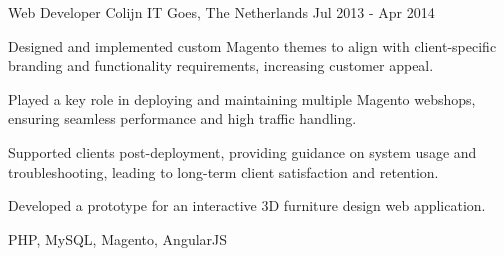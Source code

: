 \begin{cventries}
  \cventry
    {Web Developer} %
    {Colijn IT} %
    {Goes, The Netherlands} %
    {Jul 2013 - Apr 2014} %
    {
      \begin{cvitems} %
        \item {Designed and implemented custom Magento themes to align with client-specific branding and functionality requirements, increasing customer appeal.}
        \item {Played a key role in deploying and maintaining multiple Magento webshops, ensuring seamless performance and high traffic handling.  }
        \item {Supported clients post-deployment, providing guidance on system usage and troubleshooting, leading to long-term client satisfaction and retention.}
        \item {Developed a prototype for an interactive 3D furniture design web application.}
      \end{cvitems}
    }
    {PHP, MySQL, Magento, AngularJS}
\end{cventries}

